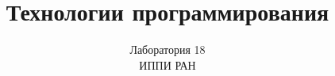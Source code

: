 \documentclass{article}
\begin{document}
\renewenvironment{itemize}[1]{\begin{compactitem}#1}{\end{compactitem}}
\renewenvironment{enumerate}[1]{\begin{compactenum}#1}{\end{compactenum}}
\renewenvironment{description}[0]{\begin{compactdesc}}{\end{compactdesc}}

\title{Технологии программирования}
\author{Лаборатория 18\\ИППИ РАН}
\date{} 								
\maketitle
\tableofcontents

\newcommand{\todo}[2]{\paragraph{TODO: \colorbox{red}{#1}}\begin{quote}
{#2}
\end{quote}}

{}
{}
{}
{}
{}
{}
\end{document}
